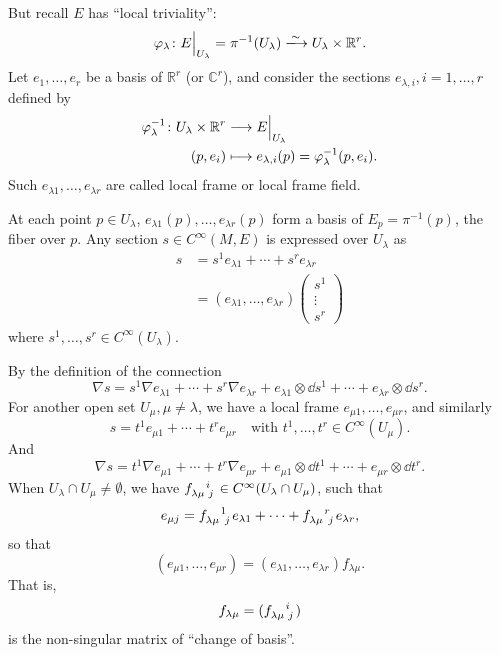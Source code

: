 \documentclass[12pt]{article}
\begin{document}
But recall \(E\) has ``local triviality'': \[
    \vphi_\lambda\colon E\Big|_{U_\lambda}=\pi^{-1}(U_\lambda)
    \xlongrightarrow{\sim} U_\lambda\times \mathbb{R}^r
.\] Let \(e_1,\ldots,e_r\) be a basis of \(\mathbb{R}^r\) (or
\(\mathbb{C}^r\)), and consider the sections \(e_{\lambda,i},i=1,\ldots,
r\) defined by \begin{align*}
    \varphi_\lambda^{-1}\colon U_\lambda\times \mathbb{R}^r
    &\longrightarrow E\Big|_{U_\lambda} \\
    (p,e_i) &\longmapsto e_{\lambda,i}(p)=\varphi_\lambda^{-1}(p,e_i)
.\end{align*}
Such \(e_{\lambda 1},\ldots,e_{\lambda r}\) are called local frame
or local frame field.

At each point \(p\in U_\lambda\),
\(e_{\lambda 1}(p),\ldots,e_{\lambda r}(p)\) form a basis of
\(E_p=\pi^{-1}(p)\), the fiber over \(p\).
Any section \(s \in C^\infty(M,E)\) is expressed over \(U_\lambda\) as
\begin{align*}
    s&=s^1e_{\lambda 1}+\cdots +s^r e_{\lambda r} \\
    &= (e_{\lambda 1},\ldots,e_{\lambda r})\begin{pmatrix}
        s^1 \\ \vdots \\ s^r
    \end{pmatrix}
\end{align*}
where \(s^1,\ldots,s^r\in C^\infty(U_\lambda)\).

By the definition of the connection \[
    \nabla s=s^1\nabla e_{\lambda 1}+\cdots +s^r\nabla e_{\lambda r}
    +e_{\lambda 1}\otimes \dd{s^1}+\cdots +e_{\lambda r}\otimes \dd{s^r}
.\] For another open set \(U_\mu,\mu\neq \lambda\), we have a local frame
\(e_{\mu 1},\ldots,e_{\mu r}\), and similarly \[
    s=t^1 e_{\mu 1}+\cdots +t^r e_{\mu r}\quad
    \text{with }t^1,\ldots,t^r\in C^\infty(U_\mu)
.\] And \[
    \nabla s=t^1\nabla e_{\mu 1}+\cdots +t^r\nabla e_{\mu r}
    +e_{\mu 1}\otimes \dd{t^1}+\cdots +e_{\mu r}\otimes \dd{t^r}
.\] When \(U_\lambda \cap U_\mu\neq \emptyset\), we have \(\tensor{f}
{_\lambda_\mu^i_j}\in C^\infty(U_\lambda \cap U_\mu)\), such that \[
    e_{\mu j}=\tensor{f}{_\lambda_\mu^1_j} e_{\lambda 1}+\cdots +
    \tensor{f}{_\lambda_\mu^r_j}e_{\lambda r}
,\] so that
\begin{equation}\label{eq:1-2-1}
(e_{\mu 1},\ldots,e_{\mu r})=(e_{\lambda 1},\ldots,e_{\lambda r})
f_{\lambda \mu}
.\end{equation}
That is, \[
    f_{\lambda \mu}=(\tensor{f}{_\lambda_\mu^i_j})
\] is the non-singular matrix of ``change of basis''.
\end{document}
